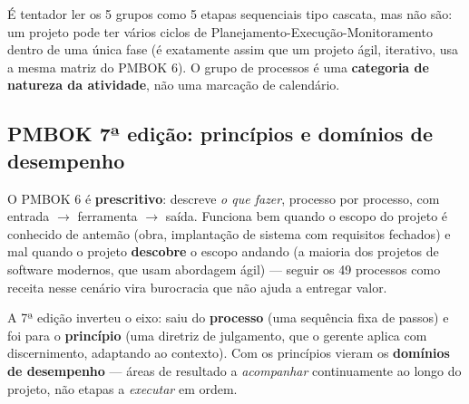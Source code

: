 \begin{cuidado}
É tentador ler os 5 grupos como 5 etapas sequenciais tipo cascata, mas não
são: um projeto pode ter vários ciclos de Planejamento-Execução-Monitoramento
dentro de uma única fase (é exatamente assim que um projeto ágil, iterativo,
usa a mesma matriz do PMBOK 6). O grupo de processos é uma \textbf{categoria
de natureza da atividade}, não uma marcação de calendário.
\end{cuidado}

\subsection{PMBOK 7ª edição: princípios e domínios de desempenho}

\begin{conceito}
O PMBOK 6 é \textbf{prescritivo}: descreve \emph{o que fazer}, processo por
processo, com entrada $\to$ ferramenta $\to$ saída. Funciona bem quando o
escopo do projeto é conhecido de antemão (obra, implantação de sistema com
requisitos fechados) e mal quando o projeto \textbf{descobre} o escopo
andando (a maioria dos projetos de software modernos, que usam abordagem
ágil) --- seguir os 49 processos como receita nesse cenário vira burocracia
que não ajuda a entregar valor.

A 7ª edição inverteu o eixo: saiu do \textbf{processo} (uma sequência fixa
de passos) e foi para o \textbf{princípio} (uma diretriz de julgamento, que
o gerente aplica com discernimento, adaptando ao contexto). Com os
princípios vieram os \textbf{domínios de desempenho} --- áreas de resultado
a \emph{acompanhar} continuamente ao longo do projeto, não etapas a
\emph{executar} em ordem.
\end{conceito}

